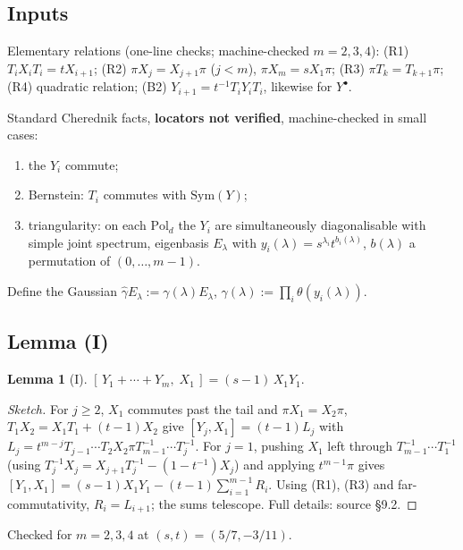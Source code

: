 \documentclass[11pt]{article}
\newtheorem{lemma}{Lemma}[section]
\theoremstyle{definition}
\newcommand{\bul}{\bullet}
\begin{document}
\subsection{Inputs}
Elementary relations (one-line checks; machine-checked $m=2,3,4$): (R1) $T_iX_iT_i=tX_{i+1}$; (R2) $\pi X_j=X_{j+1}\pi$ ($j<m$), $\pi X_m=sX_1\pi$; (R3) $\pi T_k=T_{k+1}\pi$; (R4) quadratic relation; (B2) $Y_{i+1}=t^{-1}T_iY_iT_i$, likewise for $Y^\bul$.

Standard Cherednik facts, \textbf{locators not verified}, machine-checked in small cases:
\begin{enumerate}[label=(C\arabic*)]
\item the $Y_i$ commute;
\item Bernstein: $T_i$ commutes with $\mathrm{Sym}(Y)$;
\item triangularity: on each $\mathrm{Pol}_d$ the $Y_i$ are simultaneously diagonalisable with simple joint spectrum, eigenbasis $E_\lambda$ with $y_i(\lambda)=s^{\lambda_i}t^{b_i(\lambda)}$, $b(\lambda)$ a permutation of $(0,\dots,m-1)$.
\end{enumerate}
Define the Gaussian $\hat\gamma E_\lambda:=\gamma(\lambda)E_\lambda$, $\gamma(\lambda):=\prod_i\theta(y_i(\lambda))$.

\subsection{Lemma (I)}
\begin{lemma}[I]
$[\,Y_1+\cdots+Y_m,\;X_1\,]=(s-1)\,X_1Y_1.$
\end{lemma}
\begin{proof}[Sketch]
For $j\ge2$, $X_1$ commutes past the tail and $\pi X_1=X_2\pi$, $T_1X_2=X_1T_1+(t-1)X_2$ give $[Y_j,X_1]=(t-1)L_j$ with $L_j=t^{m-j}T_{j-1}\cdots T_2X_2\pi T_{m-1}^{-1}\cdots T_j^{-1}$. For $j=1$, pushing $X_1$ left through $T_{m-1}^{-1}\cdots T_1^{-1}$ (using $T_j^{-1}X_j=X_{j+1}T_j^{-1}-(1-t^{-1})X_j$) and applying $t^{m-1}\pi$ gives $[Y_1,X_1]=(s-1)X_1Y_1-(t-1)\sum_{i=1}^{m-1}R_i$. Using (R1), (R3) and far-commutativity, $R_i=L_{i+1}$; the sums telescope. Full details: source \S9.2.
\end{proof}
Checked for $m=2,3,4$ at $(s,t)=(5/7,-3/11)$.
\end{document}
